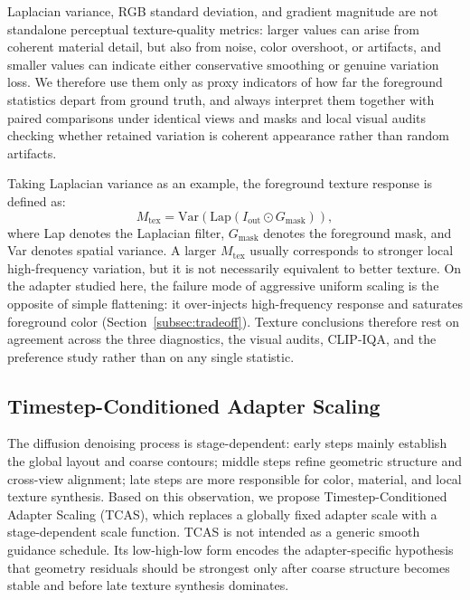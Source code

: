 \documentclass[times,twocolumn,final]{elsarticle}
\begin{document}
Laplacian variance, RGB standard deviation, and gradient magnitude are not standalone perceptual texture-quality metrics: larger values can arise from coherent material detail, but also from noise, color overshoot, or artifacts, and smaller values can indicate either conservative smoothing or genuine variation loss. We therefore use them only as proxy indicators of how far the foreground statistics depart from ground truth, and always interpret them together with paired comparisons under identical views and masks and local visual audits checking whether retained variation is coherent appearance rather than random artifacts.

Taking Laplacian variance as an example, the foreground texture response is defined as:
\begin{equation}
M_\text{tex} = \text{Var}(\text{Lap}(I_\text{out} \odot G_\text{mask})),
\end{equation}
where Lap denotes the Laplacian filter, $G_\text{mask}$ denotes the foreground mask, and Var denotes spatial variance. A larger $M_\text{tex}$ usually corresponds to stronger local high-frequency variation, but it is not necessarily equivalent to better texture. On the adapter studied here, the failure mode of aggressive uniform scaling is the opposite of simple flattening: it over-injects high-frequency response and saturates foreground color (Section~\ref{subsec:tradeoff}). Texture conclusions therefore rest on agreement across the three diagnostics, the visual audits, CLIP-IQA, and the preference study rather than on any single statistic.

\subsection{Timestep-Conditioned Adapter Scaling}
\label{subsec:tcas}

The diffusion denoising process is stage-dependent: early steps mainly establish the global layout and coarse contours; middle steps refine geometric structure and cross-view alignment; late steps are more responsible for color, material, and local texture synthesis. Based on this observation, we propose Timestep-Conditioned Adapter Scaling (TCAS), which replaces a globally fixed adapter scale with a stage-dependent scale function. TCAS is not intended as a generic smooth guidance schedule. Its low-high-low form encodes the adapter-specific hypothesis that geometry residuals should be strongest only after coarse structure becomes stable and before late texture synthesis dominates.
\end{document}
